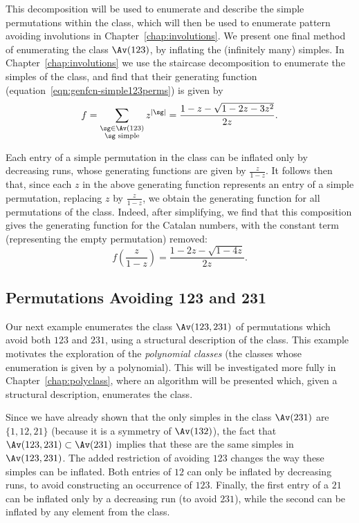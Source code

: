 \documentclass[12pt,twoside]{memoir}
\begin{document}
      This decomposition will be used to enumerate and describe the simple
      permutations within the class, which will then be used to enumerate pattern
      avoiding involutions in Chapter~\ref{chap:involutions}. 
      We present one final method of enumerating the class $\Av(123)$, by
      inflating the (infinitely many) simples. In Chapter~\ref{chap:involutions}
      we use the staircase decomposition to enumerate the simples of the class,
      and find that their generating function
      (equation~\ref{eqn:genfcn-simple123perms}) is given by 
      $$ f = \sum_{\substack{ \sg \in \Av(123) \\ \sg \text{ simple}}}
          z^{|\sg|} = \frac{1 - z - \sqrt{1 - 2z - 3z^2}}{2z} .$$

      Each entry of a simple permutation in the class can be inflated only by
      decreasing runs, whose generating functions are given by $\frac{z}{1-z}$.
      It follows then that, since each $z$ in the above generating function
      represents an entry of a simple permutation, replacing $z$ by
      $\frac{z}{1-z}$, we obtain the generating function for all permutations of
      the class. Indeed, after simplifying, we find that this composition gives
      the generating function for the Catalan numbers, with the constant term
      (representing the empty permutation) removed: 
      $$ f\left(\frac{z}{1-z}\right) = \frac{1 - 2z - \sqrt{1-4z}}{2z}.$$



    \subsection{Permutations Avoiding 123 and 231}
    \label{prelim:sec:av123+231}

      Our next example enumerates the class $\Av(123, 231)$ of
      permutations which avoid both $123$ and $231$, using a structural
      description of the class. This example motivates the exploration of the
      \emph{polynomial classes} (the classes whose enumeration is given by a
      polynomial). This will be investigated more fully in
      Chapter~\ref{chap:polyclass}, where an algorithm will be presented which,
      given a structural description, enumerates the class. 

      Since we have already shown that the only simples in the class $\Av (231)$
      are $\{1, 12, 21\}$ (because it is a symmetry of $\Av(132)$), the fact that
      $\Av(123, 231) \subset \Av(231)$ implies that these are the same simples in
      $\Av(123, 231)$. The added restriction of avoiding $123$ changes the way
      these simples can be inflated. Both entries of $12$ can only be inflated by
      decreasing runs, to avoid constructing an occurrence of $123$. Finally, the
      first entry of a $21$ can be inflated only by a decreasing run (to avoid
      $231$), while the second can be inflated by any element from the class. 
      
\end{document}
